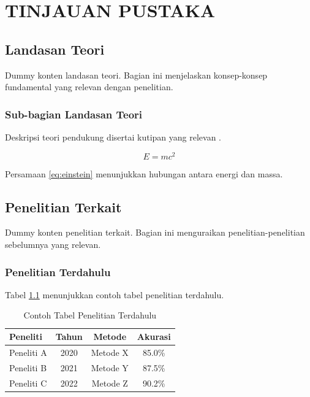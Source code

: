 \chapter{TINJAUAN PUSTAKA}
\label{bab:tinjauan_pustaka}

\section{Landasan Teori}
\label{sec:landasan_teori}

Dummy konten landasan teori. Bagian ini menjelaskan konsep-konsep fundamental yang relevan dengan penelitian.

\subsection{Sub-bagian Landasan Teori}
\label{subsec:subbagian_teori}

Deskripsi teori pendukung disertai kutipan yang relevan \cite{dummy2024reference}.

\begin{equation}
    E = mc^2
    \label{eq:einstein}
\end{equation}

Persamaan \ref{eq:einstein} menunjukkan hubungan antara energi dan massa.

\section{Penelitian Terkait}
\label{sec:penelitian_terkait}

Dummy konten penelitian terkait. Bagian ini menguraikan penelitian-penelitian sebelumnya yang relevan.

\subsection{Penelitian Terdahulu}
\label{subsec:penelitian_terdahulu}

Tabel \ref{tab:contoh_tabel} menunjukkan contoh tabel penelitian terdahulu.

\begin{table}[h]
    \centering
    \caption{Contoh Tabel Penelitian Terdahulu}
    \label{tab:contoh_tabel}
    \begin{tabularx}{\textwidth}{X c c c}
        \toprule
        \textbf{Peneliti} & \textbf{Tahun} & \textbf{Metode} & \textbf{Akurasi} \\
        \midrule
        Peneliti A & 2020 & Metode X & 85.0\% \\
        Peneliti B & 2021 & Metode Y & 87.5\% \\
        Peneliti C & 2022 & Metode Z & 90.2\% \\
        \bottomrule
    \end{tabularx}
\end{table}

